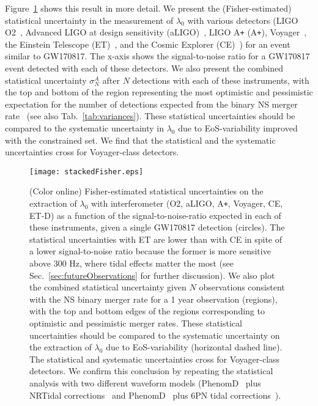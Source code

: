 \documentclass[prd,twocolumn,nofootinbib,superscriptaddress,amsmath,amssymb]{revtex4-1}
\begin{document}
Figure~\ref{fig:stackedFisher} shows this result in more detail. We present the (Fisher-estimated) statistical uncertainty in the measurement of $\lambda_{0}$ with various detectors (LIGO O2~\cite{aLIGO}, Advanced LIGO at design sensitivity (aLIGO)~\cite{aLIGO}, LIGO A\texttt{+} (A\texttt{+})\cite{Ap_Voyager_CE}, Voyager~\cite{Ap_Voyager_CE}, the Einstein Telescope (ET)~\cite{ET}, and the Cosmic Explorer (CE)~\cite{Ap_Voyager_CE}) for an event similar to GW170817. The x-axis shows the signal-to-noise ratio for a GW170817 event detected with each of these detectors. We also present the combined statistical uncertainty $\sigma^A_N$ after $N$ detections with each of these instruments, with the top and bottom of the region representing the most optimistic and pessimistic expectation for the number of detections expected from the binary NS merger rate~\cite{Abbott2017} (see also Tab.~\ref{tab:variances}). These statistical uncertainties should be compared to the systematic uncertainty in $\lambda_{0}$ due to EoS-variability improved with the constrained set. We find that the statistical and the systematic uncertainties cross for Voyager-class detectors.

\begin{figure}
\begin{center} 
\texttt{[image: stackedFisher.eps]}
\end{center}
\caption{(Color online) Fisher-estimated statistical uncertainties on the extraction of $\lambda_{0}$ with interferometer (O2, aLIGO, A\texttt{+}, Voyager, CE, ET-D) as a function of the signal-to-noise-ratio expected in each of these instruments, given a single GW170817 detection (circles). The statistical uncertainties with ET are lower than with CE in spite of a lower signal-to-noise ratio because the former is more sensitive above 300 Hz, where tidal effects matter the most (see Sec.~\ref{sec:futureObservations} for further discussion). We also plot the combined statistical uncertainty given $N$ observations consistent with the NS binary merger rate for a 1 year observation (regions), with the top and bottom edges of the regions corresponding to optimistic and pessimistic merger rates. These statistical uncertainties should be compared to the systematic uncertainty on the extraction of $\lambda_{0}$ due to EoS-variability (horizontal dashed line). The statistical and systematic uncertainties cross for Voyager-class detectors. We confirm this conclusion by repeating the statistical analysis with two different waveform models (PhenomD~\cite{PhenomDI,PhenomDII} plus NRTidal corrections~\cite{Samajdar:NRTidal} and PhenomD~\cite{PhenomDI,PhenomDII} plus 6PN tidal corrections~\cite{Wade:tidalCorrections}).}
\label{fig:stackedFisher}
\end{figure} 
\end{document}
